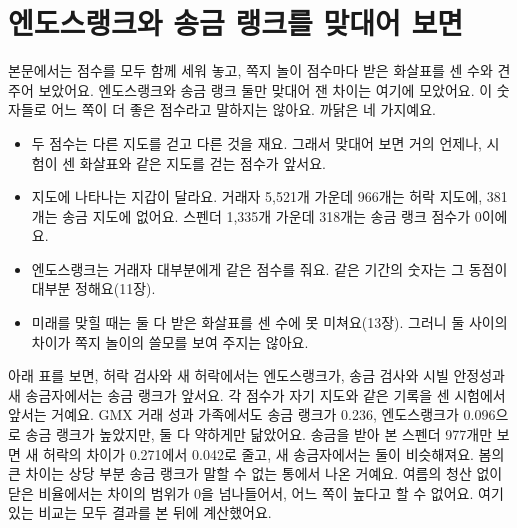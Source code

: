 \chapter{엔도스랭크와 송금 랭크를 맞대어 보면}
\label{ch:er-awp-side}

본문에서는 점수를 모두 함께 세워 놓고, 쪽지 놀이 점수마다 받은 화살표를 센 수와 견주어 보았어요.
엔도스랭크와 송금 랭크 둘만 맞대어 잰 차이는 여기에 모았어요.
이 숫자들로 어느 쪽이 더 좋은 점수라고 말하지는 않아요.
까닭은 네 가지예요.

\begin{itemize}
\item 두 점수는 다른 지도를 걷고 다른 것을 재요. 그래서 맞대어 보면 거의 언제나, 시험이 센 화살표와 같은 지도를 걷는 점수가 앞서요.
\item 지도에 나타나는 지갑이 달라요. 거래자 5,521개 가운데 966개는 허락 지도에, 381개는 송금 지도에 없어요. 스펜더 1,335개 가운데 318개는 송금 랭크 점수가 0이에요.
\item 엔도스랭크는 거래자 대부분에게 같은 점수를 줘요. 같은 기간의 숫자는 그 동점이 대부분 정해요(11장).
\item 미래를 맞힐 때는 둘 다 받은 화살표를 센 수에 못 미쳐요(13장). 그러니 둘 사이의 차이가 쪽지 놀이의 쓸모를 보여 주지는 않아요.
\end{itemize}

아래 표를 보면, 허락 검사와 새 허락에서는 엔도스랭크가, 송금 검사와 시빌 안정성과 새 송금자에서는 송금 랭크가 앞서요.
각 점수가 자기 지도와 같은 기록을 센 시험에서 앞서는 거예요.
GMX 거래 성과 가족에서도 송금 랭크가 0.236, 엔도스랭크가 0.096으로 송금 랭크가 높았지만, 둘 다 약하게만 닮았어요.
송금을 받아 본 스펜더 977개만 보면 새 허락의 차이가 0.271에서 0.042로 줄고, 새 송금자에서는 둘이 비슷해져요.
봄의 큰 차이는 상당 부분 송금 랭크가 말할 수 없는 통에서 나온 거예요.
여름의 청산 없이 닫은 비율에서는 차이의 범위가 0을 넘나들어서, 어느 쪽이 높다고 할 수 없어요.
여기 있는 비교는 모두 결과를 본 뒤에 계산했어요.

